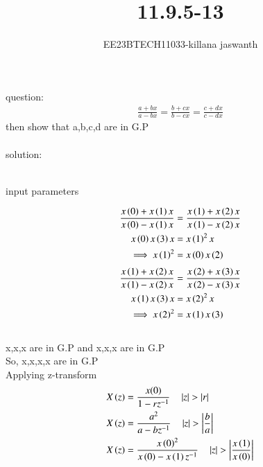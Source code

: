 \documentclass[journal,12pt,twocolumn]{IEEEtran}
\theoremstyle{remark}
\begin{document}

\vspace{3cm}

\title{11.9.5-13}
\author{EE23BTECH11033-killana jaswanth}
\maketitle
\newpage

\bigskip

\renewcommand{\thefigure}{\theenumi}
\renewcommand{\thetable}{\theenumi}
question:\begin{align}
\frac{a+bx}{a-bx}=\frac{b+cx}{b-cx}=\frac{c+dx}{c-dx}
\end{align}
then show that a,b,c,d are in G.P\\\\
solution:\\
\\\begin{table}[!ht]
 \centering
  
   \caption{input parameters}
   \label{tab:11.9.5.13}
   \end{table}
\begin{align}
\frac{x\left(0\right)+x\left(1\right)x}{x\left(0\right)-x\left(1\right)x}&=\frac{x\left(1\right)+x\left(2\right)x}{x\left(1\right)-x\left(2\right)x}\\
x\left(0\right)x\left(3\right)x&=x\left(1\right)^2x\\
\implies x\left(1\right)^2&=x\left(0\right)x\left(2\right)
\end{align}
\begin{align}
\frac{x\left(1\right)+x\left(2\right)x}{x\left(1\right)-x\left(2\right)x}&=\frac{x\left(2\right)+x\left(3\right)x}{x\left(2\right)-x\left(3\right)x}\\
x\left(1\right)x\left(3\right)x&=x\left(2\right)^2x\\
\implies x\left(2\right)^2&=x\left(1\right)x\left(3\right)
\end{align}\\
x,x,x are in G.P and x,x,x are in G.P\\
So, x,x,x,x are in G.P\\
Applying z-transform\\
\begin{align}
X\left(z\right)&=\frac{x(0)}{1-rz^{-1}} \quad \left\vert z\right\vert>\left\vert r\right\vert\\
X\left(z\right)&=\frac{a^2}{a-bz^{-1}}\quad \left\vert z\right\vert>\left\vert\frac{b}{a}\right\vert\\
X\left(z\right)&=\frac{x\left(0\right)^2}{x\left(0\right)-x\left(1\right)z^{-1}}\quad \left\vert z\right\vert>\left\vert\frac{x\left(1\right)}{x\left(0\right)}\right\vert
\end{align}
\end{document}
